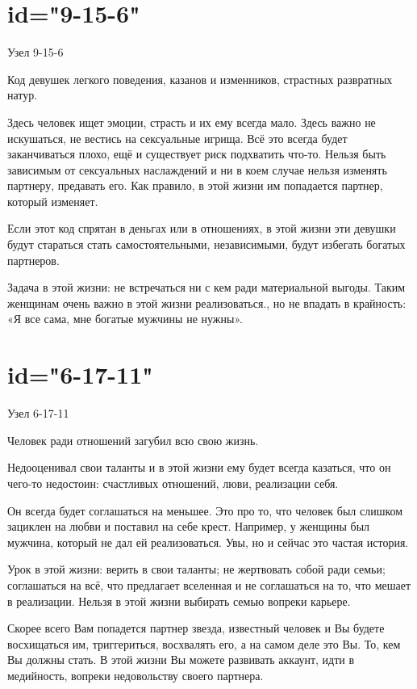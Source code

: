 \section{id="9-15-6"}{Узел 9-15-6}
\item Код девушек легкого поведения, казанов и изменников, 
страстных развратных натур.
\item Здесь человек ищет эмоции, страсть и их ему всегда мало. 
Здесь важно не искушаться, не вестись на сексуальные игрища. 
Всё это всегда будет заканчиваться плохо, ещё и существует 
риск подхватить что-то. Нельзя быть зависимым от сексуальных 
наслаждений и ни в коем случае нельзя изменять партнеру, 
предавать его. Как правило, в этой жизни им попадается партнер, 
который изменяет.
\item Если этот код спрятан в деньгах или в отношениях, в этой 
жизни эти девушки будут стараться стать самостоятельными, 
независимыми, будут избегать богатых партнеров.
\item Задача в этой жизни: не встречаться ни с кем ради 
материальной выгоды. Таким женщинам очень важно в этой жизни 
реализоваться., но не впадать в крайность: «Я все сама, мне 
богатые мужчины не нужны».
\endsection

\section{id="6-17-11"}{Узел 6-17-11}
\item Человек ради отношений загубил всю свою жизнь.
\item Недооценивал свои таланты и в этой жизни ему будет всегда 
казаться, что он чего-то недостоин: счастливых отношений, 
люви, реализации себя.
\item Он всегда будет соглашаться на меньшее. Это про то, что 
человек был слишком зациклен на любви и поставил на себе крест. 
Например, у женщины был мужчина, который не дал ей реализоваться. 
Увы, но и сейчас это частая история.
\item Урок в этой жизни: верить в свои таланты; не жертвовать 
собой ради семьи; соглашаться на всё, что предлагает вселенная 
и не соглашаться на то, что мешает в реализации. Нельзя в этой 
жизни выбирать семью вопреки карьере.
\item Скорее всего Вам попадется партнер звезда, известный 
человек и Вы будете восхищаться им, триггериться, восхвалять 
его, а на самом деле это Вы. То, кем Вы должны стать. В этой 
жизни Вы можете развивать аккаунт, идти в медийность, вопреки 
недовольству своего партнера.
\endsection

